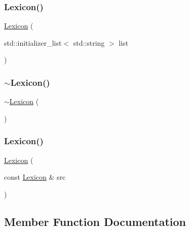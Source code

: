 \mbox{\label{classLexicon_a0acc6dfba69bc35cba25ee02ac91c4e5}} 
\subsubsection{\texorpdfstring{Lexicon()}{Lexicon()}\hspace{0.1cm}{\footnotesize\ttfamily [4/5]}}
{\footnotesize\ttfamily \mbox{\hyperlink{classLexicon}{Lexicon}} (\begin{DoxyParamCaption}\item[{std\+::initializer\+\_\+list$<$ std\+::string $>$}]{list }\end{DoxyParamCaption})}

\mbox{\label{classLexicon_a9d71fdc56ec42614e240463e6724969e}} 
\subsubsection{\texorpdfstring{$\sim$\+Lexicon()}{~Lexicon()}}
{\footnotesize\ttfamily $\sim$\mbox{\hyperlink{classLexicon}{Lexicon}} (\begin{DoxyParamCaption}{ }\end{DoxyParamCaption})\hspace{0.3cm}{\ttfamily [virtual]}}

\mbox{\label{classLexicon_acd310b995d41180f2f29bd68bec7d290}} 
\subsubsection{\texorpdfstring{Lexicon()}{Lexicon()}\hspace{0.1cm}{\footnotesize\ttfamily [5/5]}}
{\footnotesize\ttfamily \mbox{\hyperlink{classLexicon}{Lexicon}} (\begin{DoxyParamCaption}\item[{const \mbox{\hyperlink{classLexicon}{Lexicon}} \&}]{src }\end{DoxyParamCaption})}



\subsection{Member Function Documentation}
\mbox{\label{classLexicon_ae678e727fb107637268e8f00cd759889}} 
